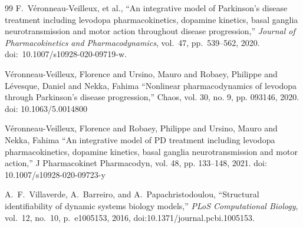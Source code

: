 \begin{thebibliography}{99}
F.~V\'{e}ronneau-Veilleux, et al., ``An integrative model of Parkinson's disease treatment including levodopa pharmacokinetics, dopamine kinetics, basal ganglia neurotransmission and motor action throughout disease progression,'' \textit{Journal of Pharmacokinetics and Pharmacodynamics}, vol.~47, pp.~539--562, 2020. doi:~10.1007/s10928-020-09719-w.

 V\'eronneau-Veilleux, Florence and Ursino, Mauro and Robaey, Philippe and L\'evesque, Daniel and Nekka, Fahima ``Nonlinear pharmacodynamics of levodopa through Parkinson's disease progression,'' Chaos, vol. 30, no. 9, pp. 093146, 2020. doi: 10.1063/5.0014800

 V\'eronneau-Veilleux, Florence and Robaey, Philippe and Ursino, Mauro and Nekka, Fahima ``An integrative model of PD treatment including levodopa pharmacokinetics, dopamine kinetics, basal ganglia neurotransmission and motor action,'' J Pharmacokinet Pharmacodyn, vol. 48, pp. 133--148, 2021. doi: 10.1007/s10928-020-09723-y

A.~F.~Villaverde, A.~Barreiro, and A.~Papachristodoulou, ``Structural identifiability of dynamic systems biology models,'' \textit{PLoS Computational Biology}, vol.~12, no.~10, p.~e1005153, 2016, doi:10.1371/journal.pcbi.1005153.

\end{thebibliography}
